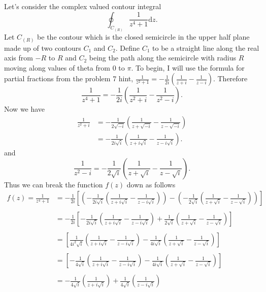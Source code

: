 \documentclass[10pt]{amsart}
\newcommand{\D}{\mathrm{d}}
\theoremstyle{nonumberplain}
\begin{document}
\begin{enumerate}[label={\bf {\arabic*}:}]
\noindent
Let's consider the complex valued contour integral 
$$
\oint_{C_{(R)}} \frac{1}{z^4 + 1} \D z.
$$
Let $C_{(R)}$ be the contour which is the closed semicircle in the upper half plane made up of two contours $C_1$ and $C_2$.
Define $C_1$ to be a straight line along the real axis from $-R$ to $R$ and $C_2$ being the path along the semicircle with radius $R$ moving along values of theta from $0$ to $\pi$.
To begin, I will use the formula for partial fractions from the problem 7 hint,
$
\frac{1}{z^2 + 1} = -\frac{1}{2i}\left(\frac{1}{z + i} - \frac{1}{z - i}\right).
$
Therefore
$$
\frac{1}{z^4 + 1} = -\frac{1}{2i}\left(\frac{1}{z^2 + i} - \frac{1}{z^2 - i}\right).
$$
Now we have
\begin{align*}
 \frac{1}{z^2 + i} &= -\frac{1}{2\sqrt{-i}}\left( \frac{1}{z + \sqrt{-i}} - \frac{1}{z - \sqrt{-i}} \right) \\
	&= -\frac{1}{2i\sqrt{i}}\left( \frac{1}{z + i\sqrt{i}} - \frac{1}{z - i\sqrt{i}} \right).
\end{align*}
and
$$
\frac{1}{z^2 - i} = -\frac{1}{2\sqrt{i}}\left( \frac{1}{z + \sqrt{i}} - \frac{1}{z - \sqrt{i}} \right).
$$
Thus we can break the function $f(z)$ down as follows
\begin{align*}
f(z) = \frac{1}{z^4 + 1} &= -\frac{1}{2i}
	\left[
		\left( -\frac{1}{2i\sqrt{i}}\left( \frac{1}{z + i\sqrt{i}} - \frac{1}{z - i\sqrt{i}} \right) \right)
		- \left( -\frac{1}{2\sqrt{i}}\left( \frac{1}{z + \sqrt{i}} - \frac{1}{z - \sqrt{i}} \right) \right)
	\right] \\ \\
	&= -\frac{1}{2i}
	\left[
		-\frac{1}{2i\sqrt{i}}\left( \frac{1}{z + i\sqrt{i}} - \frac{1}{z - i\sqrt{i}} \right)
		+ \frac{1}{2\sqrt{i}}\left( \frac{1}{z + \sqrt{i}} - \frac{1}{z - \sqrt{i}} \right)
	\right] \\ \\
	&= \left[
		\frac{1}{4i^2\sqrt{i}}\left( \frac{1}{z + i\sqrt{i}} - \frac{1}{z - i\sqrt{i}} \right)
		- \frac{1}{4i\sqrt{i}}\left( \frac{1}{z + \sqrt{i}} - \frac{1}{z - \sqrt{i}} \right)
	\right] \\ \\
	&= \left[
		- \frac{1}{4\sqrt{i}}\left( \frac{1}{z + i\sqrt{i}} - \frac{1}{z - i\sqrt{i}} \right)
		- \frac{1}{4i\sqrt{i}}\left( \frac{1}{z + \sqrt{i}} - \frac{1}{z - \sqrt{i}} \right)
	\right] \\ \\
	&= - \frac{1}{4\sqrt{i}} \left( \frac{1}{z + i\sqrt{i}}\right)
		+ \frac{1}{4\sqrt{i}} \left(\frac{1}{z - i\sqrt{i}} \right)

\end{align*}
\end{enumerate}
\end{document}

